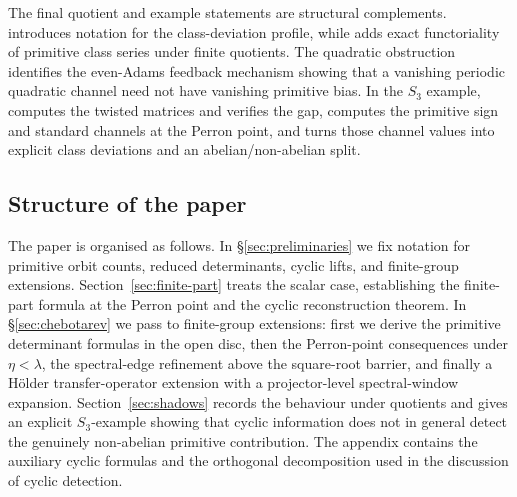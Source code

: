 The final quotient and example statements are structural complements.
 introduces notation for
the class-deviation profile, while
 adds exact functoriality of primitive
class series under finite quotients. The quadratic obstruction
 identifies the even-Adams
feedback mechanism showing that a vanishing periodic quadratic channel
need not have vanishing primitive bias. In the \(S_3\) example,
 computes the twisted matrices and
verifies the gap,  computes
the primitive sign and standard channels at the Perron point, and
 turns those channel values into explicit
class deviations and an abelian/non-abelian split.

\subsection{Structure of the paper}

The paper is organised as follows. In \S\ref{sec:preliminaries} we fix
notation for primitive orbit counts, reduced determinants, cyclic lifts,
and finite-group extensions. Section~\ref{sec:finite-part} treats the
scalar case, establishing the finite-part formula at the Perron point
and the cyclic reconstruction theorem. In
\S\ref{sec:chebotarev} we pass to finite-group extensions: first we
derive the primitive determinant formulas in the open disc, then the
Perron-point consequences under \(\eta<\lambda\), the spectral-edge
refinement above the square-root barrier, and finally a H\"older
transfer-operator extension with a projector-level spectral-window
expansion. Section~\ref{sec:shadows} records the
behaviour under quotients and gives an explicit \(S_3\)-example showing
that cyclic information does not in general detect the genuinely
non-abelian primitive contribution. The appendix contains the auxiliary
cyclic formulas and the orthogonal decomposition used in the discussion
of cyclic detection.
